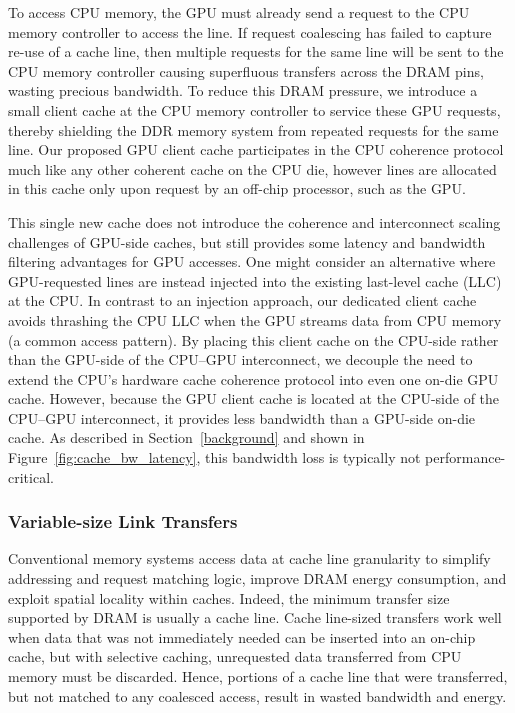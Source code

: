 To access CPU memory, the GPU must already send a request to the CPU
memory controller to access the line. If request coalescing has failed to
capture re-use of a cache line, then multiple requests for the same line will
be sent to the CPU memory controller causing superfluous transfers across the DRAM
pins, wasting precious bandwidth.  To reduce this DRAM pressure, we introduce a small 
client cache at the CPU memory controller to service
these GPU requests, thereby shielding the DDR memory system from
repeated requests for the same line.  Our proposed GPU client cache participates in the 
CPU coherence protocol much like any other 
coherent cache on the CPU die, however lines are allocated in this cache only upon 
request by an off-chip processor, such as the GPU\@.

This single new cache does not introduce the 
coherence and interconnect scaling challenges of GPU-side caches,
but still provides some latency and bandwidth filtering advantages
for GPU accesses. One might consider an alternative where GPU-requested lines are instead injected into
the existing last-level cache (LLC) at the CPU.  In contrast to an injection approach, our
dedicated client cache avoids thrashing the CPU LLC 
when the GPU streams data from CPU memory (a common access pattern).
By placing this client cache on the CPU-side rather than the GPU-side of the CPU--GPU 
interconnect, we decouple the need to extend the CPU's hardware cache coherence protocol into even one on-die GPU cache.
However, because the GPU client cache is located at the CPU-side of the CPU--GPU interconnect,
it provides less bandwidth than a GPU-side on-die cache. As described in Section~\ref{background} and 
shown in Figure~\ref{fig:cache_bw_latency}, this bandwidth loss is typically not performance-critical.

\subsubsection{Variable-size Link Transfers}
\label{variablesizing}

Conventional memory systems access data at cache line granularity to 
simplify addressing and request matching logic, improve DRAM energy consumption, and 
exploit spatial locality within caches.  Indeed, the minimum transfer size supported
by DRAM is usually a cache line.  Cache line-sized transfers work well when data
that was not immediately needed can be inserted into an on-chip cache, but
with selective caching, unrequested data transferred from CPU memory must be discarded.  
Hence, portions of a cache line that
were transferred, but not matched to any coalesced access, result in wasted
bandwidth and energy. 

